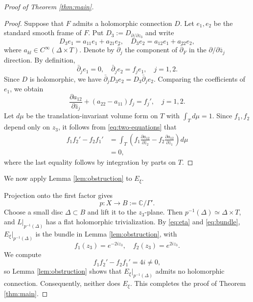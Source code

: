 \documentclass[11pt]{amsart}
\newcommand{\bp}{\bar{\partial}}
\newcommand{\C}{\mathbb C}
\numberwithin{equation}{section}
\theoremstyle{definition}
\theoremstyle{plain}
\theoremstyle{plain}
\theoremstyle{definition}
\theoremstyle{stepstyle}
\begin{document}
\begin{proof}[{Proof of Theorem \ref{thm:main}}]
		\begin{proof}
			Suppose that $F$ admits a holomorphic connection $D$. Let $e_1,e_2$
			be the standard smooth frame of $F$. Put
			$D_3:=D_{\partial/\partial z_3}$ and write
			$$
			D_3e_1=a_{11}e_1+a_{21}e_2,\quad
			D_3e_2=a_{12}e_1+a_{22}e_2,
			$$
			where $a_{kl}\in C^\infty(\Delta\times T)$. Denote by $\bp_j$ the component
			of $\bp_F$ in the $\partial/\partial\bar z_j$ direction. By definition,
			$$
			\bp_je_1=0,\quad \bp_je_2=f_je_1,\quad j=1,2.
			$$
			Since $D$ is holomorphic, we have
			$\bp_jD_3e_2=D_3\bp_je_2$. Comparing the coefficients of
			$e_1$, we obtain
			\begin{equation}\label{eq:two-equations}
				\frac{\partial a_{12}}{\partial\bar z_j}
				+(a_{22}-a_{11})f_j=f_j',\quad j=1,2.
			\end{equation}
			Let $d\mu$ be the translation-invariant volume form on $T$ with
			$\int_Td\mu=1$. Since $f_1,f_2$ depend only on $z_3$, it follows from
			\eqref{eq:two-equations} that
			$$
			\begin{aligned}
				f_1f_2'-f_2f_1'
				&=\int_T\left(f_1\frac{\partial a_{12}}{\partial\bar z_2}
				-f_2\frac{\partial a_{12}}{\partial\bar z_1}\right)d\mu\\
				&=0,
			\end{aligned}
			$$
			where the last equality follows by integration by parts on $T$.
		\end{proof}
		
		
		We now apply Lemma \ref{lem:obstruction} to $E_\xi$. 
		
		Projection onto the first factor gives
		$$
		p:X\rightarrow B:=\C/\Gamma'.
		$$
		Choose a small disc $\Delta\subset B$ and lift it to the $z_3$-plane. Then
		$p^{-1}(\Delta)\simeq\Delta\times T$, and
		$L|_{p^{-1}(\Delta)}$ has a flat holomorphic trivialization.
		By \eqref{eq:eta} and \eqref{eq:bundle}, $E_\xi|_{p^{-1}(\Delta)}$ is the bundle in
		Lemma \ref{lem:obstruction}, with
		$$
		f_1(z_3)=e^{-2iz_3},\quad f_2(z_3)=e^{2iz_3}.
		$$
		We compute
		$$
		f_1f_2'-f_2f_1'=4i\neq0,
		$$
		so Lemma \ref{lem:obstruction} shows that
		$E_\xi|_{p^{-1}(\Delta)}$ admits no holomorphic connection.
		Consequently, neither does $E_\xi$. This completes the proof of
		Theorem \ref{thm:main}.
	\end{proof}
	
	
	
\end{document}
